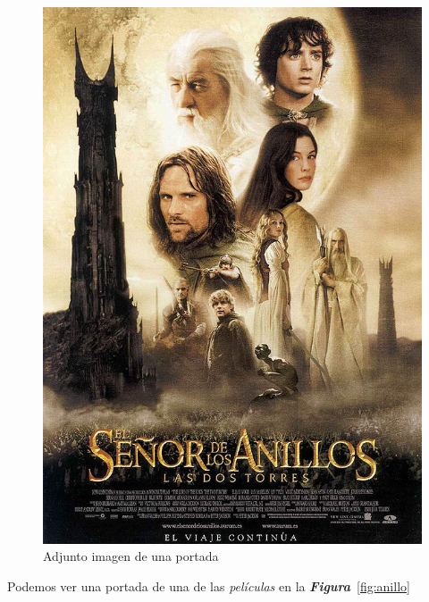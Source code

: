 \begin{figure}[h]
\centering
\includegraphics[scale=0.5]{IMG/13.jpg}
\caption {Adjunto imagen de una portada}

\label{fig:anillos}
\end{figure}

Podemos ver una portada de una de las \emph{películas} en la \emph{\textbf{Figura}}~\ref{fig:anillo}


